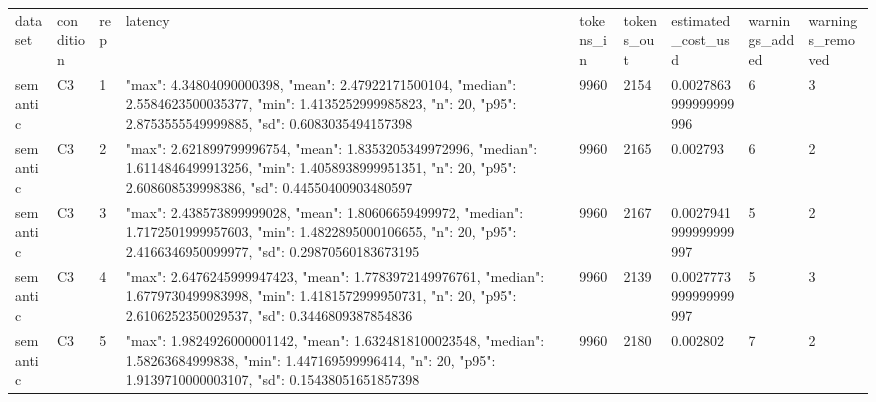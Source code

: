 \begin{tabular}{lllllllll}
dataset & condition & rep & latency & tokens\_in & tokens\_out & estimated\_cost\_usd & warnings\_added & warnings\_removed \\
semantic & C3 & 1 & {"max": 4.34804090000398, "mean": 2.47922171500104, "median": 2.5584623500035377, "min": 1.4135252999985823, "n": 20, "p95": 2.8753555549999885, "sd": 0.6083035494157398} & 9960 & 2154 & 0.0027863999999999996 & 6 & 3 \\
semantic & C3 & 2 & {"max": 2.621899799996754, "mean": 1.8353205349972996, "median": 1.6114846499913256, "min": 1.4058938999951351, "n": 20, "p95": 2.608608539998386, "sd": 0.44550400903480597} & 9960 & 2165 & 0.002793 & 6 & 2 \\
semantic & C3 & 3 & {"max": 2.438573899999028, "mean": 1.80606659499972, "median": 1.7172501999957603, "min": 1.4822895000106655, "n": 20, "p95": 2.4166346950099977, "sd": 0.29870560183673195} & 9960 & 2167 & 0.0027941999999999997 & 5 & 2 \\
semantic & C3 & 4 & {"max": 2.6476245999947423, "mean": 1.7783972149976761, "median": 1.6779730499983998, "min": 1.4181572999950731, "n": 20, "p95": 2.6106252350029537, "sd": 0.3446809387854836} & 9960 & 2139 & 0.0027773999999999997 & 5 & 3 \\
semantic & C3 & 5 & {"max": 1.9824926000001142, "mean": 1.6324818100023548, "median": 1.58263684999838, "min": 1.447169599996414, "n": 20, "p95": 1.9139710000003107, "sd": 0.15438051651857398} & 9960 & 2180 & 0.002802 & 7 & 2 \\
\end{tabular}
